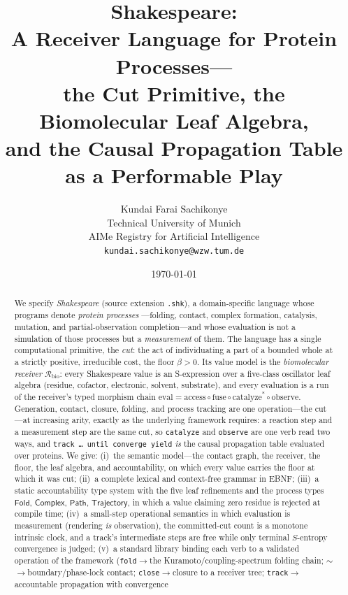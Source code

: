 \documentclass[11pt,a4paper]{article}
\title{\textbf{Shakespeare:\\[3pt]
A Receiver Language for Protein Processes---\\
the Cut Primitive, the Biomolecular Leaf Algebra,\\
and the Causal Propagation Table as a Performable Play}}
\author{%
Kundai Farai Sachikonye\\
\small Technical University of Munich\\
\small AIMe Registry for Artificial Intelligence\\
\small \texttt{kundai.sachikonye@wzw.tum.de}}
\date{\today}
\theoremstyle{thmstyle}
\theoremstyle{definition}
\theoremstyle{remark}
\newcommand{\flo}{\beta}
\newcommand{\Recv}{\mathcal{R}_{\mathrm{bio}}}
\newcommand{\eval}{\mathrm{eval}}
\newcommand{\shk}[1]{\texttt{#1}}
\begin{document}
\maketitle

\begin{abstract}
\noindent
We specify \emph{Shakespeare} (source extension \shk{.shk}), a
domain-specific language whose programs denote \emph{protein processes}
---folding, contact, complex formation, catalysis, mutation, and
partial-observation completion---and whose evaluation is not a
simulation of those processes but a \emph{measurement} of them. The
language has a single computational primitive, the \emph{cut}: the act
of individuating a part of a bounded whole at a strictly positive,
irreducible cost, the floor $\flo>0$. Its value model is the
\emph{biomolecular receiver} $\Recv$: every Shakespeare value is an
S-expression over a five-class oscillator leaf algebra (residue,
cofactor, electronic, solvent, substrate), and every evaluation is a run
of the receiver's typed morphism chain
$\eval = \mathrm{access}\circ\mathrm{fuse}\circ\mathrm{catalyze}^{*}\circ
\mathrm{observe}$. Generation, contact, closure, folding, and process
tracking are one operation---the cut---at increasing arity, exactly as
the underlying framework requires: a reaction step and a measurement step
are the same cut, so \shk{catalyze} and \shk{observe} are one verb read
two ways, and \shk{track\,\ldots\,until\,converge\,yield} \emph{is} the
causal propagation table evaluated over proteins. We give: (i)~the
semantic model---the contact graph, the receiver, the floor, the leaf
algebra, and accountability, on which every value carries the floor at
which it was cut; (ii)~a complete lexical and context-free grammar in
EBNF; (iii)~a static accountability type system with the five leaf
refinements and the process types $\mathsf{Fold}$, $\mathsf{Complex}$,
$\mathsf{Path}$, $\mathsf{Trajectory}$, in which a value claiming zero
residue is rejected at compile time; (iv)~a small-step operational
semantics in which evaluation is measurement (rendering \emph{is}
observation), the committed-cut count is a monotone intrinsic clock, and
a track's intermediate steps are free while only terminal
$S$-entropy convergence is judged; (v)~a standard library binding each
verb to a validated operation of the framework
(\shk{fold}$\to$the Kuramoto/coupling-spectrum folding chain;
\shk{$\sim$}$\to$boundary/phase-lock contact; \shk{close}$\to$closure to a
receiver tree; \shk{track}$\to$accountable propagation with convergence

\end{abstract}
\end{document}
